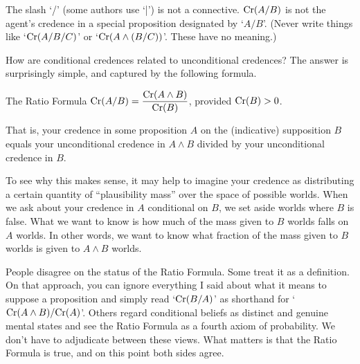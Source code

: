 The slash `/' (some authors use `|') is not a connective. $\text{Cr}(A/B)$ is not the
agent's credence in a special proposition designated by `$A/B$'. (Never write
things like `$\text{Cr}(A/B/C)$' or `$\text{Cr}(A \land (B/C))$'. These have no meaning.)


How are conditional credences related to unconditional credences?
The answer is surprisingly simple, and captured by the following
formula.
\begin{genericthm}{The Ratio Formula}
  \quad\newline
  $\text{Cr}(A/B) = \dfrac{\text{Cr}(A \land B)}{\text{Cr}(B)}$, provided $\text{Cr}(B)>0$.
\end{genericthm}
That is, your credence in some proposition $A$ on the (indicative) supposition
$B$ equals your unconditional credence in $A \land B$ divided by your
unconditional credence in $B$.

To see why this makes sense, it may help to imagine your credence as
distributing a certain quantity of ``plausibility mass'' over
the space of possible worlds. When we ask about your credence in
$A$ conditional on $B$, we set aside worlds where $B$ is false. What
we want to know is how much of the mass given to $B$ worlds falls on
$A$ worlds. In other words, we want to know what fraction of the mass
given to $B$ worlds is given to $A \land B$ worlds.

People disagree on the status of the Ratio Formula. Some treat it as a
definition. On that approach, you can ignore everything I said about
what it means to suppose a proposition and simply read `$\text{Cr}(B/A)$' as
shorthand for `$\text{Cr}(A \land B)/\text{Cr}(A)$'. Others regard conditional
beliefs as distinct and genuine mental states and see the Ratio
Formula as a fourth axiom of probability. We
don't have to adjudicate between these views. What matters is that the
Ratio Formula is true, and on this point both sides agree.

